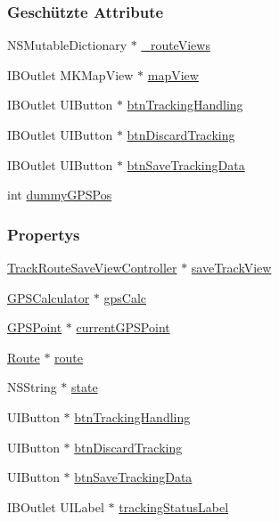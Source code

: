 \subsubsection*{Geschützte Attribute}
\begin{DoxyCompactItemize}
\item 
NSMutableDictionary $\ast$ \hyperlink{interface_track_route_view_controller_a0048826a66f9f97e05c950c9cdb8efe9}{\_\-routeViews}
\item 
IBOutlet MKMapView $\ast$ \hyperlink{interface_track_route_view_controller_acfdb8629be1a1a142886ecdedbffd9a9}{mapView}
\item 
IBOutlet UIButton $\ast$ \hyperlink{interface_track_route_view_controller_ad5dac71250de25316647ab4f8b3d5ade}{btnTrackingHandling}
\item 
IBOutlet UIButton $\ast$ \hyperlink{interface_track_route_view_controller_ab96d243d196054d287fc27b9e4f21c11}{btnDiscardTracking}
\item 
IBOutlet UIButton $\ast$ \hyperlink{interface_track_route_view_controller_a746c3e70dcd66a9aebd7728c2446d5b6}{btnSaveTrackingData}
\item 
int \hyperlink{interface_track_route_view_controller_ae26e0607317b6f8389a08dc7951e18cd}{dummyGPSPos}
\end{DoxyCompactItemize}
\subsubsection*{Propertys}
\begin{DoxyCompactItemize}
\item 
\hyperlink{interface_track_route_save_view_controller}{TrackRouteSaveViewController} $\ast$ \hyperlink{interface_track_route_view_controller_a155bf96abb68b5883fdca56f840fc6fa}{saveTrackView}
\item 
\hyperlink{interface_g_p_s_calculator}{GPSCalculator} $\ast$ \hyperlink{interface_track_route_view_controller_a6283bcb2582d7b30fb3a14b85b8e0f3a}{gpsCalc}
\item 
\hyperlink{interface_g_p_s_point}{GPSPoint} $\ast$ \hyperlink{interface_track_route_view_controller_a8ce8f0629bb7838572fa5ab4cb1015f6}{currentGPSPoint}
\item 
\hyperlink{interface_route}{Route} $\ast$ \hyperlink{interface_track_route_view_controller_a9fd48f64851735328ea161516096137f}{route}
\item 
NSString $\ast$ \hyperlink{interface_track_route_view_controller_ae1dba17062d54b302adb5926250a3823}{state}
\item 
UIButton $\ast$ \hyperlink{interface_track_route_view_controller_a6b43bd4f8e42c4aa6cb090dc5ef14479}{btnTrackingHandling}
\item 
UIButton $\ast$ \hyperlink{interface_track_route_view_controller_a2ea7a7f545535b9e94105d0706ce23b4}{btnDiscardTracking}
\item 
UIButton $\ast$ \hyperlink{interface_track_route_view_controller_a54cf7a93068f9ae133a033aa8eb35449}{btnSaveTrackingData}
\item 
IBOutlet UILabel $\ast$ \hyperlink{interface_track_route_view_controller_a91899ed881e6b01cd319463c0d03b504}{trackingStatusLabel}
\end{DoxyCompactItemize}



